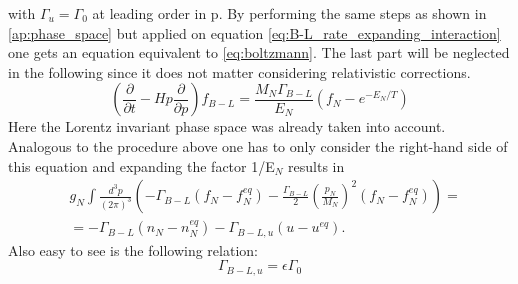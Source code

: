 with $\Gamma_u=\Gamma_0$ at leading order in p. \newline\indent
By performing the same steps as shown in \ref{ap:phase_space} but applied on equation \eqref{eq:B-L_rate_expanding_interaction} one gets an equation equivalent to \eqref{eq:boltzmann}. The last part will be neglected in the following since it does not matter considering relativistic corrections.
\begin{equation*}
\left(\frac{\partial}{\partial t}-Hp\frac{\partial}{\partial p}\right)f_{B-L}=\frac{M_N\Gamma_{B-L}}{E_N}\left(f_N-e^{-E_N/T}\right)
\end{equation*}
Here the Lorentz invariant phase space was already taken into account.\newline\indent
Analogous to the procedure above one has to only consider the right-hand side of this equation and expanding the factor 1/E$_N$ results in
\begin{align*}
&g_N\int \frac{d^3p}{(2\pi)^3}\left(-\Gamma_{B-L}\left(f_N-f_N^{eq}\right)-\frac{\Gamma_{B-L}}{2}\left(\frac{p_N}{M_N}\right)^2\left(f_N-f_N^{eq}\right)\right)=\\&=-\Gamma_{B-L}\left(n_N-n_N^{eq}\right)-\Gamma_{B-L,u}\left(u-u^{eq}\right).
\end{align*}
Also easy to see is the following relation:
\begin{equation*}
	\Gamma_{B-L,u}=\epsilon\Gamma_0
\end{equation*}
